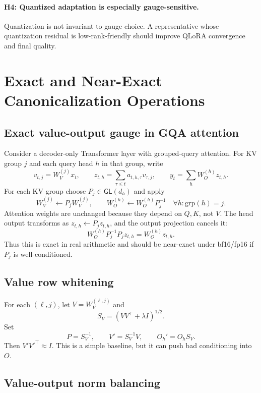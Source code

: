 \documentclass[11pt]{article}
\newcommand{\GL}{\mathsf{GL}}
\newcommand{\grp}{\mathrm{grp}}
\begin{document}
\paragraph{H4: Quantized adaptation is especially gauge-sensitive.}
Quantization is not invariant to gauge choice. A representative whose quantization residual is low-rank-friendly should improve QLoRA convergence and final quality.

\section{Exact and Near-Exact Canonicalization Operations}

\subsection{Exact value-output gauge in GQA attention}

Consider a decoder-only Transformer layer with grouped-query attention. For KV group $j$ and each query head $h$ in that group, write
\[
    v_{t,j}=W_V^{(j)}x_t,
    \qquad
    z_{t,h}=\sum_{\tau\le t}a_{t,h,\tau}v_{\tau,j},
    \qquad
    y_t=\sum_h W_O^{(h)}z_{t,h}.
\]
For each KV group choose $P_j\in\GL(d_h)$ and apply
\[
    W_V^{(j)}\leftarrow P_j W_V^{(j)},
    \qquad
    W_O^{(h)}\leftarrow W_O^{(h)}P_j^{-1}
    \quad \forall h: \grp(h)=j.
\]
Attention weights are unchanged because they depend on $Q,K$, not $V$. The head output transforms as $z_{t,h}\leftarrow P_j z_{t,h}$, and the output projection cancels it:
\[
    W_O^{(h)}P_j^{-1}P_jz_{t,h}=W_O^{(h)}z_{t,h}.
\]
Thus this is exact in real arithmetic and should be near-exact under bf16/fp16 if $P_j$ is well-conditioned.

\subsection{Value row whitening}

For each $(\ell,j)$, let $V=W_V^{(\ell,j)}$ and
\[
    S_V=(VV^\top+\lambda I)^{1/2}.
\]
Set
\[
    P=S_V^{-1},
    \qquad
    V'=S_V^{-1}V,
    \qquad
    O_h'=O_hS_V.
\]
Then $V'V'^\top\approx I$. This is a simple baseline, but it can push bad conditioning into $O$.

\subsection{Value-output norm balancing}
\end{document}

